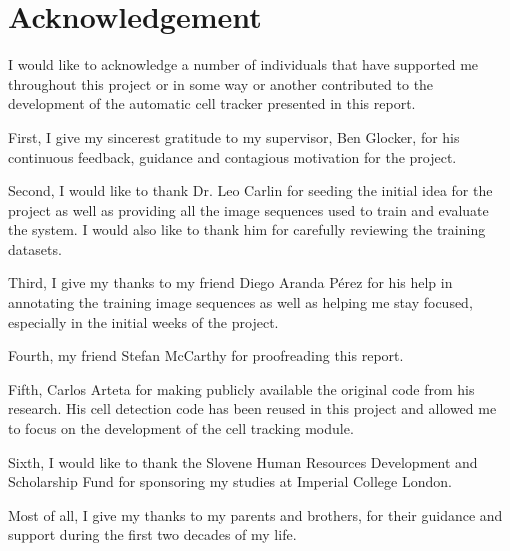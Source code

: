 \chapter*{Acknowledgement}

I would like to acknowledge a number of individuals that have supported me throughout this project or in some way or another contributed to the development of the automatic cell tracker presented in this report.

First, I give my sincerest gratitude to my supervisor, Ben Glocker, for his continuous feedback, guidance and contagious motivation for the project. 

Second, I would like to thank Dr. Leo Carlin for seeding the initial idea for the project as well as providing all the image sequences used to train and evaluate the system. I would also like to thank him for carefully reviewing the training datasets.

Third, I give my thanks to my friend Diego Aranda Pérez for his help in annotating the training image sequences as well as helping me stay focused, especially in the initial weeks of the project.

Fourth, my friend Stefan McCarthy for proofreading this report.

Fifth, Carlos Arteta for making publicly available the original code from his research. His cell detection code has been reused in this project and allowed me to focus on the development of the cell tracking module.

Sixth, I would like to thank the Slovene Human Resources Development and Scholarship Fund for sponsoring my studies at Imperial College London. 

Most of all, I give my thanks to my parents and brothers, for their guidance and support during the first two decades of my life.